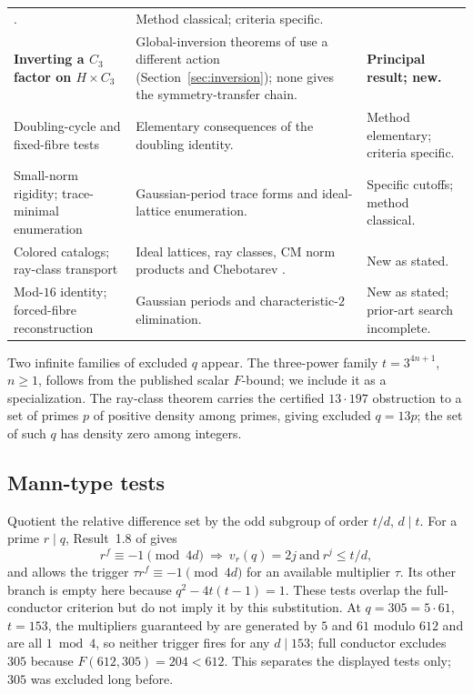 \documentclass[11pt]{article}
\theoremstyle{definition}
\theoremstyle{remark}
\begin{document}
\begin{longtable}{>{\raggedright\arraybackslash}p{}>{\raggedright\arraybackslash}p{}>{\raggedright\arraybackslash}p{}}
  \cite[Section~5]{Tan26}.
& Method classical; criteria specific. \\
\textbf{Inverting a $C_3$ factor on $H\times C_3$}
& Global-inversion theorems of \cite{AJP90} use a different action
  (Section~\ref{sec:inversion}); none gives the symmetry-transfer chain.
& \textbf{Principal result; new.} \\
Doubling-cycle and fixed-fibre tests
& Elementary consequences of the doubling identity.
& Method elementary; criteria specific. \\
Small-norm rigidity; trace-minimal enumeration
& Gaussian-period trace forms and ideal-lattice enumeration.
& Specific cutoffs; method classical. \\
Colored catalogs; ray-class transport
& Ideal lattices, ray classes, CM norm products and Chebotarev
  \cite{Sutherland21}.
& New as stated. \\
Mod-$16$ identity; forced-fibre reconstruction
& Gaussian periods and characteristic-$2$ elimination.
& New as stated; prior-art search incomplete. \\
\hline
\end{longtable}
\endgroup

Two infinite families of excluded $q$ appear. The three-power family
$t=3^{4n+1}$, $n\ge1$, follows from the published scalar $F$-bound; we
include it as a specialization. The ray-class theorem carries the certified
$13\cdot197$ obstruction to a set of primes $p$ of positive density among
primes, giving excluded $q=13p$; the set of such $q$ has density zero among
integers.

\subsection{Mann-type tests}\label{sec:mann}
Quotient the relative difference set by the odd subgroup of order $t/d$,
$d\mid t$. For a prime $r\mid q$, Result~1.8 of \cite{AJMP95} gives
\[
 r^f\equiv-1\pmod{4d}\ \Longrightarrow\ v_r(q)=2j\ \text{and}\ r^j\le t/d,
\]
and \cite[Result~3.10]{JP99} allows the trigger $\tau r^f\equiv-1\pmod{4d}$
for an available multiplier $\tau$. Its other branch is empty here because
$q^2-4t(t-1)=1$. These tests overlap the full-conductor criterion but do
not imply it by this substitution. At $q=305=5\cdot61$, $t=153$, the
multipliers guaranteed by \cite[Result~3.8]{JP99} are generated by $5$ and
$61$ modulo $612$ and are all $1\bmod4$, so neither trigger fires for any
$d\mid153$; full conductor excludes $305$ because $F(612,305)=204<612$.
This separates the displayed tests only; $305$ was excluded long before.
\end{document}
